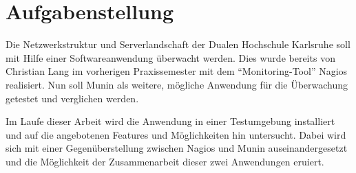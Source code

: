 \section{Aufgabenstellung}

Die Netzwerkstruktur und Serverlandschaft der Dualen Hochschule Karlsruhe soll mit Hilfe einer Softwareanwendung überwacht werden.
Dies wurde bereits von Christian Lang im vorherigen Praxissemester mit dem "`Monitoring-Tool"' Nagios realisiert.
Nun soll Munin als weitere, mögliche Anwendung für die Überwachung getestet und verglichen werden.

Im Laufe dieser Arbeit wird die Anwendung in einer Testumgebung installiert und auf die angebotenen Features und Möglichkeiten hin untersucht.
Dabei wird sich mit einer Gegenüberstellung zwischen Nagios und Munin auseinandergesetzt und die Möglichkeit der Zusammenarbeit dieser zwei Anwendungen eruiert.